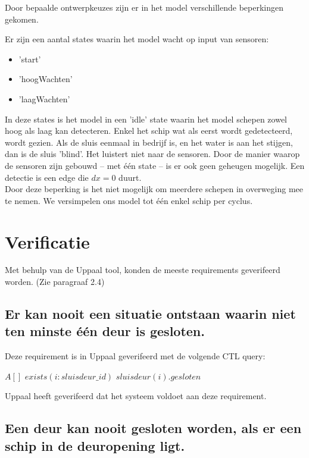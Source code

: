 \documentclass{article} %
\begin{document}
Door bepaalde ontwerpkeuzes zijn er in het model verschillende beperkingen gekomen. \par

Er zijn een aantal states waarin het model wacht op input van sensoren:

\begin{itemize}
    \item 'start'
    \item 'hoogWachten'
    \item 'laagWachten'
\end{itemize}

In deze states is het model in een 'idle' state waarin het model schepen zowel hoog als laag kan detecteren. Enkel het schip wat als eerst wordt gedetecteerd, wordt gezien. Als de sluis eenmaal in bedrijf is, en het water is aan het stijgen, dan is de sluis 'blind'. Het luistert niet naar de sensoren. Door de manier waarop de sensoren zijn gebouwd -- met één state -- is er ook geen geheugen mogelijk. Een detectie is een edge die \(dx=0\) duurt. \\
Door deze beperking is het niet mogelijk om meerdere schepen in overweging mee te nemen. We versimpelen ons model tot één enkel schip per cyclus.

\newpage

\section{Verificatie}

Met behulp van de Uppaal tool, konden de meeste requirements geverifeerd worden. (Zie paragraaf 2.4)

\subsection{Er kan nooit een situatie ontstaan waarin niet ten minste één deur is gesloten.}

Deze requirement is in Uppaal geverifeerd met de volgende CTL query:

\begin{boxA}
    $A[]$ $exists(i:sluisdeur\_id)$ $sluisdeur(i).gesloten$
\end{boxA}

Uppaal heeft geverifeerd dat het systeem voldoet aan deze requirement.

\subsection{Een deur kan nooit gesloten worden, als er een schip in de deuropening ligt.}
\end{document}
